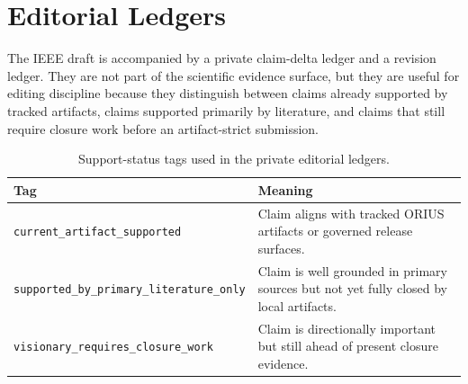 \section{Editorial Ledgers}
\label{sec:ieee-app-ledgers}

The IEEE draft is accompanied by a private claim-delta ledger and a revision
ledger. They are not part of the scientific evidence surface, but they are useful for
editing discipline because they distinguish between claims already supported by tracked
artifacts, claims supported primarily by literature, and claims that still require
closure work before an artifact-strict submission.

\begin{table}[h]
\centering
\caption{Support-status tags used in the private editorial ledgers.}
\label{tab:ieee-appendix-ledger-status}
\small
\begin{tabularx}{\columnwidth}{@{}p{}X@{}}
\toprule
\textbf{Tag} & \textbf{Meaning}\\
\midrule
\texttt{current\_artifact\_supported} & Claim aligns with tracked ORIUS artifacts or governed release surfaces.\\
\texttt{supported\_by\_primary\_literature\_only} & Claim is well grounded in primary sources but not yet fully closed by local artifacts.\\
\texttt{visionary\_requires\_closure\_work} & Claim is directionally important but still ahead of present closure evidence.\\
\bottomrule
\end{tabularx}
\end{table}
